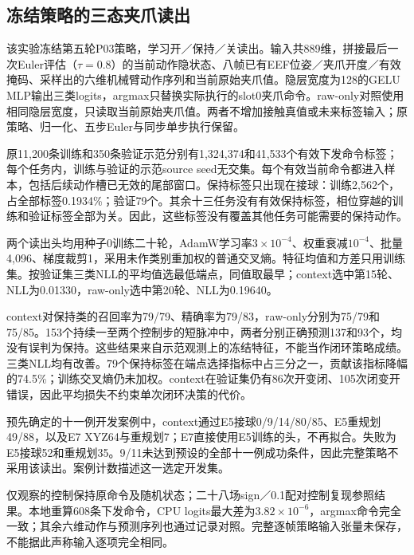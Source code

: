 \subsection{冻结策略的三态夹爪读出}
\label{app:learned_decoder_zh}
该实验冻结第五轮P03策略，学习开／保持／关读出。输入共889维，拼接最后一次Euler评估（$\tau=0.8$）的当前动作隐状态、八帧已有EEF位姿／夹爪开度／有效掩码、采样出的六维机械臂动作序列和当前原始夹爪值。隐层宽度为128的GELU MLP输出三类logits，argmax只替换实际执行的slot0夹爪命令。raw-only对照使用相同隐层宽度，只读取当前原始夹爪值。两者不增加接触真值或未来标签输入；原策略、归一化、五步Euler与同步单步执行保留。

原11,200条训练和350条验证示范分别有1,324,374和41,533个有效下发命令标签；每个任务内，训练与验证的示范source seed无交集。每个有效当前命令都进入样本，包括后续动作槽已无效的尾部窗口。保持标签只出现在接球：训练2,562个，占全部标签0.1934\%；验证79个。其余十三任务没有有效保持标签，相位穿越的训练和验证标签全部为关。因此，这些标签没有覆盖其他任务可能需要的保持动作。

两个读出头均用种子0训练二十轮，AdamW学习率$3\times10^{-4}$、权重衰减$10^{-4}$、批量4,096、梯度裁剪1，采用未作类别重加权的普通交叉熵。特征均值和方差只用训练集。按验证集三类NLL的平均值选最低端点，同值取最早；context选中第15轮、NLL为0.01330，raw-only选中第20轮、NLL为0.19640。

\begingroup
\renewenvironment{table}[1][]{\begin{readingtable}}{\end{readingtable}}

\endgroup

context对保持类的召回率为79/79、精确率为79/83，raw-only分别为75/79和75/85。153个持续一至两个控制步的短脉冲中，两者分别正确预测137和93个，均没有误判为保持。这些结果来自示范观测上的冻结特征，不能当作闭环策略成绩。
三类NLL均有改善。79个保持标签在端点选择指标中占三分之一，贡献该指标降幅的74.5\%；训练交叉熵仍未加权。context在验证集仍有86次开变闭、105次闭变开错误，因此平均损失不约束单次闭环决策的代价。

预先确定的十一例开发案例中，context通过E5接球0/9/14/80/85、E5重规划49/88，以及E7 XYZ64与重规划7；E7直接使用E5训练的头，不再拟合。失败为E5接球52和重规划35。9/11未达到预设的全部十一例成功条件，因此完整策略不采用该读出。案例计数描述这一选定开发集。

仅观察的控制保持原命令及随机状态；二十八场sign／0.1配对控制复现参照结果。本地重算608条下发命令，CPU logits最大差为$3.82\times10^{-6}$，argmax命令完全一致；其余六维动作与预测序列也通过记录对照。完整逐帧策略输入张量未保存，不能据此声称输入逐项完全相同。

